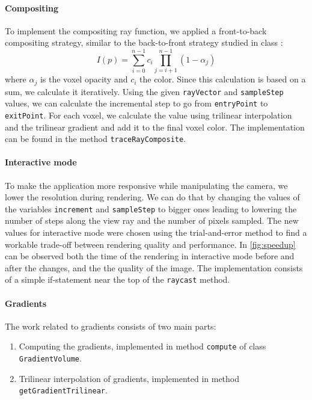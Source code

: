 \documentclass[a4paper]{article}
\begin{document}
\paragraph{Compositing}
\label{ray_composite}

To implement the compositing ray function, we applied a front-to-back compositing strategy, similar to the back-to-front strategy studied in class \citep{2imv20_2}:
$$I(p)=\sum^{n-1}_{i=0}c_i\prod^{n-1}_{j=i+1}(1-\alpha_j)$$
where $\alpha_j$ is the voxel opacity and $c_i$ the color. Since this calculation is based on a sum, we calculate it iteratively. Using the given {\tt rayVector} and {\tt sampleStep} values, we can calculate the incremental step to go from {\tt entryPoint} to {\tt exitPoint}. For each voxel, we calculate the value using trilinear interpolation and the trilinear gradient and add it to the final voxel color. The implementation can be found in the method {\tt traceRayComposite}.

\paragraph{Interactive mode}
\label{speed_up}

To make the application more responsive while manipulating the camera, we lower the resolution during rendering. We can do that by changing the values of the variables {\tt increment} and {\tt sampleStep} to bigger ones leading to lowering the number of steps along the view ray and the number of pixels sampled.  The new values for interactive mode were chosen using the trial-and-error method to find a workable trade-off between rendering quality and performance. In \autoref{fig:speedup} can be observed both the time of the rendering in interactive mode before and after the changes, and the the quality of the image. The implementation consists of a simple if-statement near the top of the {\tt raycast} method.

\paragraph{Gradients}
\label{subsec:gradients}

The work related to gradients consists of two main parts:

\begin{enumerate}[noitemsep]
  \item Computing the gradients, implemented in method {\tt compute} of class {\tt GradientVolume}.
  \item Trilinear interpolation of gradients, implemented in method {\tt getGradientTrilinear}.
\end{enumerate}
\end{document}
